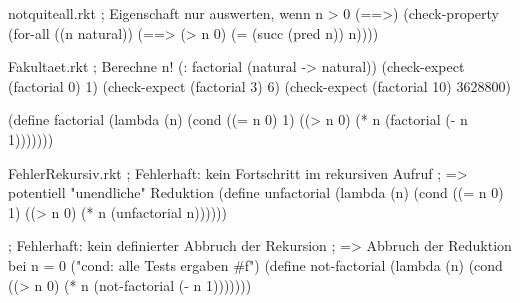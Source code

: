 \begin{filecontents*}{notquiteall.rkt}
; Eigenschaft nur auswerten, wenn n > 0 (==>)
(check-property
 (for-all ((n natural))
   (==> (> n 0)   
        (= (succ (pred n)) n))))
\end{filecontents*}
\begin{filecontents*}{Fakultaet.rkt}
; Berechne n!
(: factorial (natural -> natural))
(check-expect (factorial 0) 1)
(check-expect (factorial 3) 6)
(check-expect (factorial 10) 3628800)

(define factorial
  (lambda (n)
    (cond ((= n 0) 1)
          ((> n 0) (* n (factorial (- n 1)))))))
\end{filecontents*}
\begin{filecontents*}{FehlerRekursiv.rkt}
; Fehlerhaft: kein Fortschritt im rekursiven Aufruf
; => potentiell "unendliche" Reduktion
(define unfactorial
  (lambda (n)
    (cond ((= n 0) 1)
          ((> n 0) (* n (unfactorial n))))))

; Fehlerhaft: kein definierter Abbruch der Rekursion
; => Abbruch der Reduktion bei n = 0 ("cond: alle Tests ergaben #f")
(define not-factorial
  (lambda (n)
    (cond ((> n 0) (* n (not-factorial (- n 1)))))))
\end{filecontents*}

